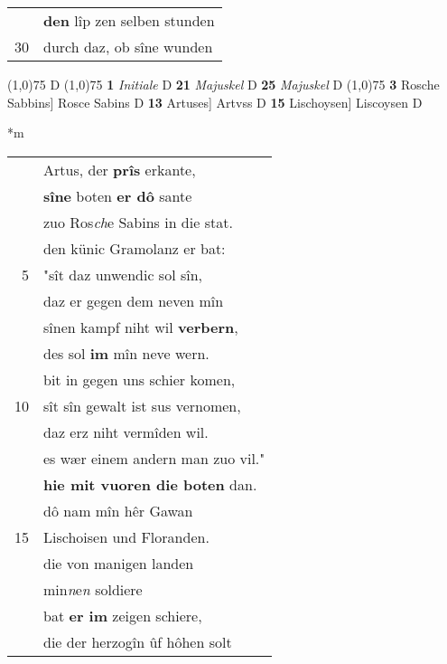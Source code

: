 \documentclass[8pt,a4paper,notitlepage]{article}
\begin{document}
\begin{table}[ht]
\begin{minipage}[t]{0.5\linewidth}
\begin{tabular}{rl}
 & \textbf{den} lîp zen selben stunden\\ 
30 & durch daz, ob sîne wunden\\ 
\end{tabular}
\scriptsize
\line(1,0){75} \newline
D \newline
\line(1,0){75} \newline
\textbf{1} \textit{Initiale} D  \textbf{21} \textit{Majuskel} D  \textbf{25} \textit{Majuskel} D  \newline
\line(1,0){75} \newline
\textbf{3} Rosche Sabbins] Rosce Sabins D \textbf{13} Artuses] Artvss D \textbf{15} Lischoysen] Liscoysen D \newline
\end{minipage}
\hspace{0.5cm}
\begin{minipage}[t]{0.5\linewidth}
\small
\begin{center}*m
\end{center}
\begin{tabular}{rl}
 & Artus, der \textbf{prîs} erkante,\\ 
 & \textbf{sîne} boten \textbf{er dô} sante\\ 
 & zuo Ros\textit{ch}e Sabins in die stat.\\ 
 & den künic Gramolanz er bat:\\ 
5 & "sît daz unwendic sol sîn,\\ 
 & daz er gegen dem neven mîn\\ 
 & sînen kampf niht wil \textbf{verbern},\\ 
 & des sol \textbf{im} mîn neve wern.\\ 
 & bit in gegen uns schier komen,\\ 
10 & sît sîn gewalt ist sus vernomen,\\ 
 & daz erz niht vermîden wil.\\ 
 & es wær einem andern man zuo vil."\\ 
 & \textbf{hie mit vuoren die boten} dan.\\ 
 & dô nam mîn hêr Gawan\\ 
15 & Lischoisen und Floranden.\\ 
 & die von manigen landen\\ 
 & min\textit{n}e\textit{n} soldiere\\ 
 & bat \textbf{er im} zeigen schiere,\\ 
 & die der herzogîn ûf hôhen solt\\ 

\end{tabular}
\end{minipage}
\end{table}
\end{document}
